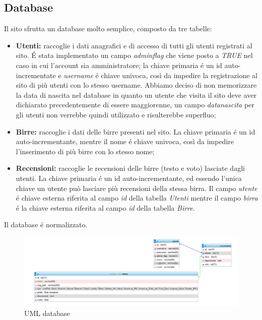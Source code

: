\newpage
\subsection{Database}
Il sito sfrutta un database molto semplice, composto da tre tabelle:
\begin{itemize}
\item \textbf{Utenti:} raccoglie i dati anagrafici e di accesso di tutti gli utenti registrati al sito. \'E stata implementato un campo \textit{admin\textunderscore flag} che viene posto a \textit{TRUE} nel caso in cui l'account sia amministratore; la chiave primaria é un id auto-incrementate e \textit{username} é chiave univoca, così da impedire la registrazione al sito di più utenti con lo stesso username. Abbiamo deciso di non memorizzare la data di nascita nel database in quanto un utente che visita il sito deve aver dichiarato precedentemente di essere maggiorenne, un campo \textit{data\textunderscore nascita} per gli utenti non verrebbe quindi utilizzato e risulterebbe superfluo;
\item \textbf{Birre:} raccoglie i dati delle birre presenti nel sito. La chiave primaria é un id auto-incrementante, mentre il nome é chiave univoca, così da impedire l'inserimento di più birre con lo stesso nome;
\item \textbf{Recensioni:} raccoglie le recensioni delle birre (testo e voto) lasciate dagli utenti. La chiave primaria é un id auto-incrementante, ed essendo l'unica chiave un utente può lasciare più recensioni della stessa birra. Il campo \textit{utente} é chiave esterna riferita al campo \textit{id} della tabella \textit{Utenti} mentre il campo \textit{birra} é la chiave esterna riferita al campo \textit{id} della tabella \textit{Birre}.
\end{itemize}
Il database é normalizzato.
\begin{figure}[H]
	\centering
	\includegraphics[width=16cm]{utility/db.png}
	\caption{UML database}
\end{figure}


